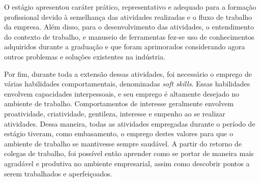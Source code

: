 \documentclass[
	12pt,				%
    oneside,			%
	a4paper,			%
	english,			%
	french,				%
	spanish,			%
	brazil				%
	]{abntex2}
\begin{document}
O estágio apresentou caráter prático, representativo e adequado para a formação profissional devido à semelhança das atividades realizadas e o fluxo de trabalho da empresa. Além disso, para o desenvolvimento das atividades, o entendimento do contexto de trabalho, e manuseio de ferramentas fez-se uso de conhecimentos adquiridos durante a graduação e que foram aprimorados considerando agora outros problemas e soluções existentes na indústria.   

Por fim, durante toda a extensão dessas atividades, foi necessário o emprego de várias habilidades comportamentais, denominadas \textit{soft skills}. Essas habilidades envolvem capacidades interpessoais, e seu emprego é altamente desejado no ambiente de trabalho. Comportamentos de interesse geralmente envolvem proatividade, criatividade, gentileza, interesse e empenho ao se realizar atividades. Dessa maneira, todas as atividades empregadas durante o período de estágio tiveram, como embasamento, o emprego destes valores para que o ambiente de trabalho se mantivesse sempre saudável. A partir do retorno de colegas de trabalho, foi possível então aprender como se portar de maneira mais agradável e produtiva no ambiente empresarial, assim como descobrir pontos a serem trabalhados e aperfeiçoados.

\postextual

%
\end{document}
